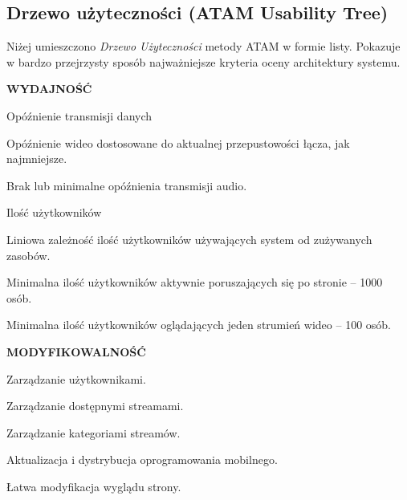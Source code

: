 \subsection{Drzewo użyteczności (ATAM Usability Tree)}
\label{sec:EtapIdrzewoUzytecznosci}

Niżej umieszczono \textit{Drzewo Użyteczności} metody ATAM w formie listy. Pokazuje w bardzo przejrzysty sposób najważniejsze kryteria oceny architektury systemu.

\begin{packed_item}
    \item{
        \textbf{WYDAJNOŚĆ}
        \begin{packed_item}
            \item{
                Opóźnienie transmisji danych
                \begin{packed_item}
                    \item{Opóźnienie wideo dostosowane do aktualnej przepustowości łącza, jak najmniejsze.}
                    \item{Brak lub minimalne opóźnienia transmisji audio.}
                \end{packed_item}
            }
            \item{
                Ilość użytkowników
                \begin{packed_item}
                    \item{Liniowa zależność ilość użytkowników używających system od zużywanych zasobów.}
                    \item{Minimalna ilość użytkowników aktywnie poruszających się po stronie -- 1000 osób.}
                    \item{Minimalna ilość użytkowników oglądających jeden strumień wideo -- 100 osób.}
                \end{packed_item}
            }
        \end{packed_item}
    }
    \item{
        \textbf{MODYFIKOWALNOŚĆ}
        \begin{packed_item}
            \item{Zarządzanie użytkownikami.}
            \item{Zarządzanie dostępnymi streamami.}
            \item{Zarządzanie kategoriami streamów.}
            \item{Aktualizacja i dystrybucja oprogramowania mobilnego.}
            \item{Łatwa modyfikacja wyglądu strony.}

\end{packed_item}}
\end{packed_item}
